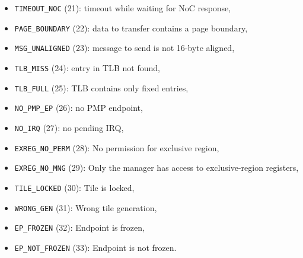 \begin{itemize}
  \item \texttt{TIMEOUT\_NOC} (21): timeout while waiting for NoC response,
  \item \texttt{PAGE\_BOUNDARY} (22): data to transfer contains a page boundary,
  \item \texttt{MSG\_UNALIGNED} (23): message to send is not 16-byte aligned,
  \item \texttt{TLB\_MISS} (24): entry in TLB not found,
  \item \texttt{TLB\_FULL} (25): TLB contains only fixed entries,
  \item \texttt{NO\_PMP\_EP} (26): no PMP endpoint,
  \item \texttt{NO\_IRQ} (27): no pending IRQ,
  \item \texttt{EXREG\_NO\_PERM} (28): No permission for exclusive region,
  \item \texttt{EXREG\_NO\_MNG} (29): Only the manager has access to exclusive-region registers,
  \item \texttt{TILE\_LOCKED} (30): Tile is locked,
  \item \texttt{WRONG\_GEN} (31): Wrong tile generation,
  \item \texttt{EP\_FROZEN} (32): Endpoint is frozen,
  \item \texttt{EP\_NOT\_FROZEN} (33): Endpoint is not frozen.
\end{itemize}
